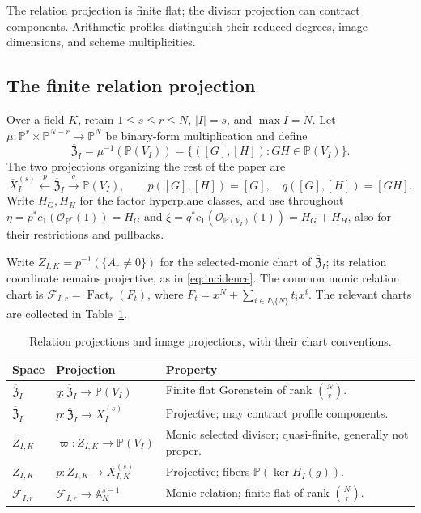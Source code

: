 \documentclass[10pt,fleqn]{article}
\numberwithin{equation}{section}
\newcommand{\A}{\mathbb A}
\newcommand{\PP}{\mathbb P}
\newcommand{\cF}{\mathcal F}
\newcommand{\Fact}{\operatorname{Fact}}
\begin{document}
The relation projection is finite flat; the divisor projection can
contract components.  Arithmetic profiles distinguish their reduced
degrees, image dimensions, and scheme multiplicities.

\subsection{The finite relation projection}
\label{r19:sec:relation-projection}
Over a field $K$, retain $1\le s\le r\le N$, $|I|=s$, and $\max I=N$.
Let $\mu:\PP^r\times\PP^{N-r}\to\PP^N$ be binary-form multiplication and define
\begin{equation}\label{eq:projective-factorization-incidence}
 \overline{\mathfrak Z}_I
 =\mu^{-1}(\PP(V_I))
 =\{([G],[H]):GH\in\PP(V_I)\}.
\end{equation}
The two projections organizing the rest of the paper are
\begin{equation}\label{eq:incidence-two-projections}
 \overline X_I^{(s)}\xleftarrow{\ p\ }
 \overline{\mathfrak Z}_I\xrightarrow{\ q\ }\PP(V_I),\qquad
 p([G],[H])=[G],\quad q([G],[H])=[GH].
\end{equation}
Write $H_G,H_H$ for the factor hyperplane classes, and use throughout
$\eta=p^*c_1(\mathcal O_{\PP^r}(1))=H_G$ and
$\xi=q^*c_1(\mathcal O_{\PP(V_I)}(1))=H_G+H_H$,
also for their restrictions and pullbacks.

Write $Z_{I,K}=p^{-1}(\{A_r\ne0\})$ for the selected-monic chart
of $\overline{\mathfrak Z}_I$; its relation coordinate remains projective,
as in \eqref{eq:incidence}.  The common monic relation chart is
$\cF_{I,r}=\Fact_r(F_t)$, where $F_t=x^N+\sum_{i\in I\setminus\{N\}}t_ix^i$.
The relevant charts are collected in Table~\ref{tab:incidence-dictionary}.

\begin{table}[H]
\centering
\caption{Relation projections and image projections, with their chart conventions.}
\label{tab:incidence-dictionary}
\begin{tabular}{@{}p{}p{}p{}@{}}
\toprule
Space & Projection & Property\\
\midrule
$\overline{\mathfrak Z}_I$ & $q:\overline{\mathfrak Z}_I\to\PP(V_I)$
 & Finite flat Gorenstein of rank $\binom Nr$.\\
$\overline{\mathfrak Z}_I$ & $p:\overline{\mathfrak Z}_I\to\overline X_I^{(s)}$
 & Projective; may contract profile components.\\
$Z_{I,K}$ & $\varpi:Z_{I,K}\to\PP(V_I)$
 & Monic selected divisor; quasi-finite, generally not proper.\\
$Z_{I,K}$ & $p:Z_{I,K}\to X_{I,K}^{(s)}$
 & Projective; fibers $\PP(\ker H_I(g))$.\\
$\cF_{I,r}$ & $\cF_{I,r}\to\A_K^{s-1}$
 & Monic relation; finite flat of rank $\binom Nr$.\\
\bottomrule
\end{tabular}
\end{table}
\end{document}
